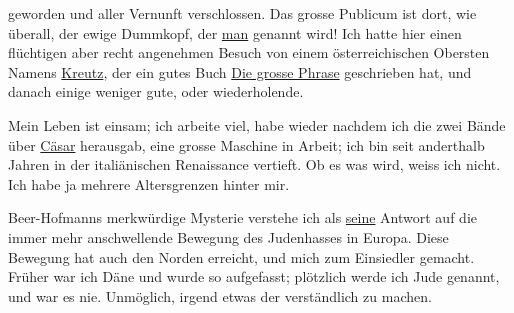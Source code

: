                geworden und aller Vernunft verschlossen. Das grosse Publicum ist dort, wie überall,
               der ewige Dummkopf, der \uline{man} genannt wird! {\pb}Ich hatte hier einen flüchtigen
               aber recht angenehmen Besuch von einem österreichischen Obersten Namens \uline{Kreutz}, der ein gutes Buch \uline{Die grosse Phrase} geschrieben hat, und danach einige weniger gute, oder wiederholende.\pend
           
\pstart
           Mein Leben ist einsam; ich arbeite viel, habe wieder nachdem ich die zwei Bände über \uline{Cäsar} herausgab, eine grosse Maschine in Arbeit; ich bin \introOben{}seit anderthalb Jahren\introOben{}
               in der italiänischen Renaissance vertieft. Ob
               es was wird, weiss ich nicht. Ich habe ja mehrere Altersgrenzen hinter mir.\pend
           
\pstart
           Beer-Hofmanns merkwürdige Mysterie verstehe ich als \uline{seine} Antwort auf die immer mehr anschwellende Bewegung des
               Judenhasses in Europa. Diese Bewegung hat auch
               den Norden erreicht, und mich zum Einsiedler
               gemacht. Früher war ich Däne und wurde so
               aufgefasst; plötzlich werde ich Jude genannt, und war es nie. Unmöglich, irgend etwas
               der \label{K_L02342-2v}\label{K_L02342-2} verständlich zu machen.\pend
           
